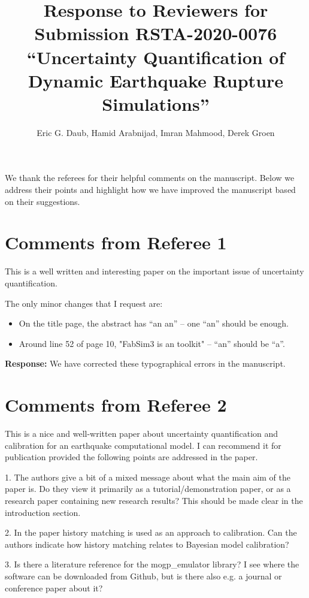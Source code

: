 \documentclass{article}
\title{Response to Reviewers for Submission RSTA-2020-0076 ``Uncertainty Quantification of Dynamic Earthquake Rupture Simulations''}
\author{Eric G. Daub, Hamid Arabnijad, Imran Mahmood, Derek Groen}
\begin{document}
\maketitle

We thank the referees for their helpful comments on the manuscript. Below
we address their points and highlight how we have improved the manuscript
based on their suggestions.

\section{Comments from Referee 1}

This is a well written and interesting paper on the important issue of uncertainty quantification.

The only minor changes that I request are:

\begin{itemize}
\item On the title page, the abstract has ``an an'' -- one ``an'' should be enough.

\item Around line 52 of page 10, "FabSim3 is an toolkit" -- ``an'' should be ``a''.
\end{itemize}
  
\textbf{Response:} We have corrected these typographical errors in the manuscript.

\section{Comments from Referee 2}

This is a nice and well-written paper about uncertainty quantification and calibration for an earthquake computational model. I can recommend it for publication provided the following points are addressed in the paper.

1. The authors give a bit of a mixed message about what the main aim of the paper is. Do they view it primarily as a tutorial/demonstration paper, or as a research paper containing new research results? This should be made clear in the introduction section.

2. In the paper history matching is used as an approach to calibration. Can the authors indicate how history matching relates to Bayesian model calibration?

3. Is there a literature reference for the mogp\_emulator library? I see where the software can be downloaded from Github, but is there also e.g. a journal or conference paper about it?
\end{document}
